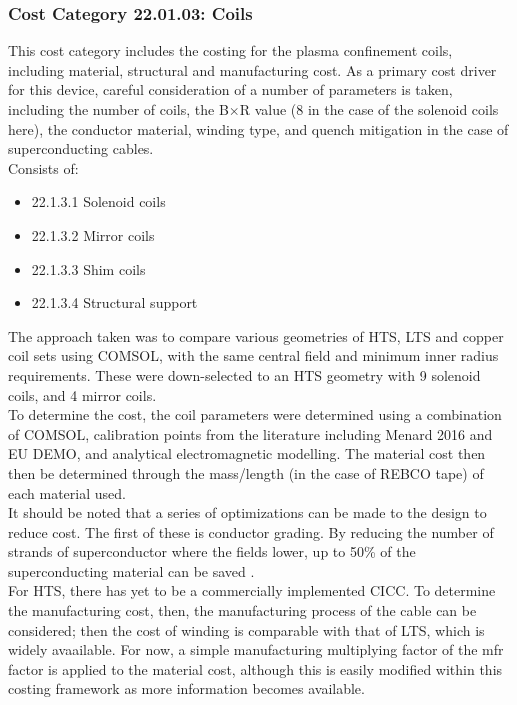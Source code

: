 \subsubsection*{Cost Category 22.01.03: Coils}

This cost category includes the costing for the plasma confinement coils, including  material, structural and manufacturing cost. As a primary cost driver for this device, careful consideration of a number of parameters is taken, including the number of coils, the B$\times$R value (8 in the case of the solenoid coils here), the conductor material, winding type, and quench mitigation in the case of superconducting cables.\\

Consists of:

\begin{itemize}
    \item 22.1.3.1 Solenoid coils
    \item 22.1.3.2 Mirror coils
    \item 22.1.3.3 Shim coils
    \item 22.1.3.4 Structural support
\end{itemize}
   

The approach taken was to compare various geometries of HTS, LTS and copper coil sets using COMSOL, with the same central field and minimum inner radius requirements. These were down-selected to an HTS geometry with 9 solenoid coils, and 4 mirror coils.\\

To determine the cost, the coil parameters were determined using a combination of COMSOL, calibration points from the literature including Menard 2016 \cite{Menard2016} and EU DEMO, and analytical electromagnetic modelling. The material cost then then be determined through the mass/length (in the case of REBCO tape) of each material used.\\

It should be noted that a series of optimizations can be made to the design to reduce cost. The first of these is conductor grading. By reducing the number of strands of superconductor where the fields lower, up to 50\% of the superconducting material can be saved \cite{uglietti2018progressing}.\\

For HTS, there has yet to be a commercially implemented CICC. To determine the manufacturing cost, then, the manufacturing process of the cable can be considered; then the cost of winding is comparable with that of LTS, which is widely avaailable. For now, a simple manufacturing multiplying factor of the mfr factor is applied to the material cost, although this is easily modified within this costing framework as more information becomes available.\\


